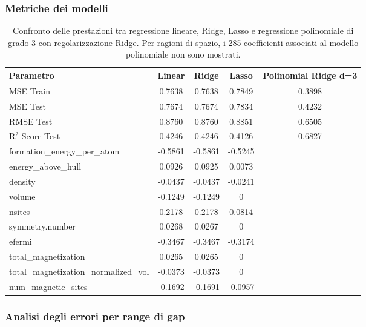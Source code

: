 \documentclass[a4paper,11pt]{article}
\begin{document}
\subsubsection*{Metriche dei modelli}
\begin{table}[h]
\centering
\footnotesize
\caption{Confronto delle prestazioni tra regressione lineare, Ridge, Lasso e regressione polinomiale di grado 3 con regolarizzazione Ridge. Per ragioni di spazio, i 285 coefficienti associati al modello polinomiale non sono mostrati.}
\label{tab:regression_comparison}
\begin{tabular}{lcccc}
\toprule
\textbf{Parametro} & \textbf{Linear} & \textbf{Ridge} & \textbf{Lasso} & \textbf{Polinomial Ridge d=3}\\
\midrule
MSE Train & 0.7638 & 0.7638 & 0.7849 & 0.3898\\
MSE Test  & 0.7674 & 0.7674 & 0.7834 & 0.4232\\
RMSE Test & 0.8760 & 0.8760 & 0.8851 & 0.6505\\
R$^2$ Score Test & 0.4246 & 0.4246 & 0.4126 & 0.6827\\
\midrule
formation\_energy\_per\_atom & -0.5861 & -0.5861 & -0.5245 & \\
energy\_above\_hull & 0.0926 & 0.0925 & 0.0073 \\
density & -0.0437 & -0.0437 & -0.0241 \\
volume & -0.1249 & -0.1249 & 0 \\
nsites & 0.2178 & 0.2178 & 0.0814 \\
symmetry.number & 0.0268 & 0.0267 & 0 \\
efermi & -0.3467 & -0.3467 & -0.3174 \\
total\_magnetization & 0.0265 & 0.0265 & 0 \\
total\_magnetization\_normalized\_vol & -0.0373 & -0.0373 & 0 \\
num\_magnetic\_sites & -0.1692 & -0.1691 & -0.0957 \\
\bottomrule
\end{tabular}
\end{table}



\subsubsection*{Analisi degli errori per range di gap}
\end{document}
